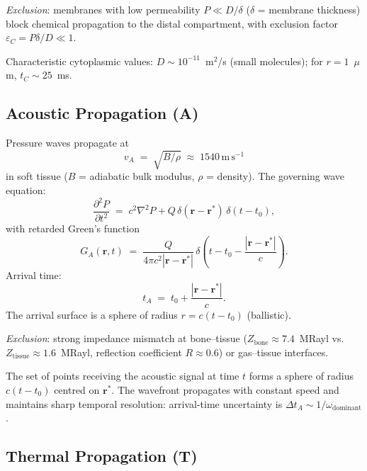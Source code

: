 \emph{Exclusion}: membranes with low permeability $P \ll D/\delta$ ($\delta$
= membrane thickness) block chemical propagation to the distal compartment,
with exclusion factor $\varepsilon_C = P\delta/D \ll 1$.

Characteristic cytoplasmic values: $D \sim 10^{-11}$~m$^2$/s (small molecules);
for $r = 1$~$\mu$m, $t_C \sim 25$~ms.

\subsection{Acoustic Propagation (A)}

Pressure waves propagate at
\begin{equation}
  v_A \;=\; \sqrt{B/\rho} \;\approx\; 1540\,\mathrm{m\,s^{-1}}
  \label{eq:vA}
\end{equation}
in soft tissue ($B$ = adiabatic bulk modulus, $\rho$ = density).  The governing
wave equation:
\begin{equation}
    \frac{\partial^2 P}{\partial t^2}
    \;=\; c^2\nabla^2 P
    + Q\,\delta(\mathbf{r} - \mathbf{r}^*)\,\delta(t - t_0),
\end{equation}
with retarded Green's function
\begin{equation}
    G_A(\mathbf{r}, t)
    \;=\; \frac{Q}{4\pi c^2|\mathbf{r}-\mathbf{r}^*|}
    \,\delta\!\left(t - t_0 - \frac{|\mathbf{r}-\mathbf{r}^*|}{c}\right).
\end{equation}
Arrival time:
\begin{equation}
    t_A \;=\; t_0 + \frac{|\mathbf{r} - \mathbf{r}^*|}{c}.
    \label{eq:tA}
\end{equation}
The arrival surface is a sphere of radius $r = c(t - t_0)$ (ballistic).

\emph{Exclusion}: strong impedance mismatch at bone--tissue ($Z_\mathrm{bone}
\approx 7.4$~MRayl vs.\ $Z_\mathrm{tissue} \approx 1.6$~MRayl, reflection
coefficient $R \approx 0.6$) or gas--tissue interfaces.

\begin{theorem}
\label{thm:acoustic-iso}
The set of points receiving the acoustic signal at time $t$ forms a sphere of
radius $c(t-t_0)$ centred on $\mathbf{r}^*$.  The wavefront propagates with
constant speed and maintains sharp temporal resolution: arrival-time
uncertainty is $\Delta t_A \sim 1/\omega_\mathrm{dominant}$.
\end{theorem}

\subsection{Thermal Propagation (T)}

